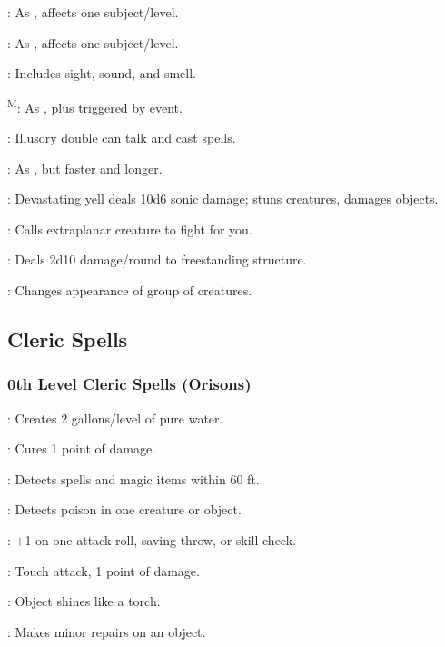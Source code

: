 : As , affects one subject/level.

: As , affects one subject/level.

: Includes sight, sound, and smell.

\textsuperscript{M}: As , plus triggered by event.

: Illusory double can talk and cast spells.

: As , but faster and longer.

: Devastating yell deals 10d6 sonic damage; stuns creatures, damages objects.

: Calls extraplanar creature to fight for you.

: Deals 2d10 damage/round to freestanding structure.

: Changes appearance of group of creatures.

\subsection{Cleric Spells}

\subsubsection{0th Level Cleric Spells (Orisons)}

: Creates 2 gallons/level of pure water.

: Cures 1 point of damage.

: Detects spells and magic items within 60 ft.

: Detects poison in one creature or object.

: +1 on one attack roll, saving throw, or skill check.

: Touch attack, 1 point of damage.

: Object shines like a torch.

: Makes minor repairs on an object.

